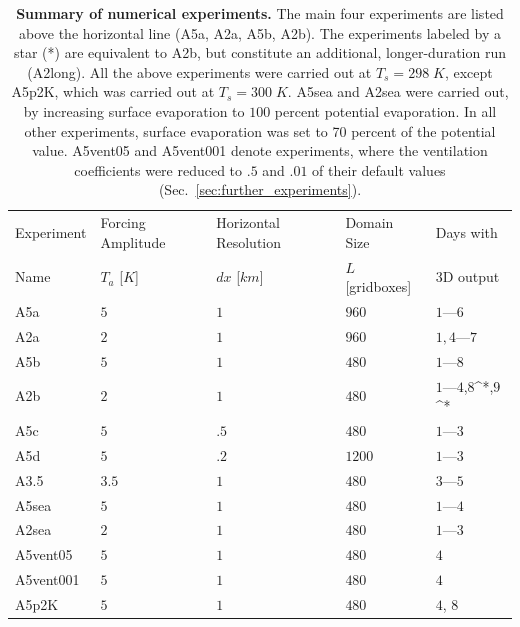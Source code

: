 \documentclass[draft,linenumbers]{agujournal2019}
\begin{document}
\begin{table}[b]
\begin{tabular}{lllll}
    Experiment & Forcing Amplitude & Horizontal Resolution & Domain Size & Days with\\
    Name & $T_a$ [$K$] & $dx$ [$km$] & $L$ [gridboxes] & 3D output\\
    \hline
    A5a & $5$ & $1$ & $960$ & $1$---$6$ \\
    A2a & $2$ & $1$ & $960$ & $1,4$---$7$ \\
    A5b & $5$ & $1$ & $480$ & $1$---$8$\\
    A2b & $2$ & $1$ & $480$ & $1$---$4$,$8$^*,$9$^*\\
    \hline
    A5c & $5$ & $.5$ & $480$ & $1$---$3$ \\
    A5d & $5$ & $.2$ & $1200$ & $1$---$3$ \\
    A3.5 & $3.5$ & $1$ & $480$ & $3$---$5$\\
    A5sea & $5$ & $1$ & $480$ & $1$---$4$\\
    A2sea & $2$ & $1$ & $480$ & $1$---$3$\\
    A5vent05 & $5$ & $1$ & $480$ & $4$\\
    A5vent001 & $5$ & $1$ & $480$ & $4$\\
    A5p2K & $5$ & $1$ & $480$ & $4$, $8$\\
    \hline
\end{tabular}
\caption{{\bf Summary of numerical experiments.}
The main four experiments are listed above the horizontal line (A5a, A2a, A5b, A2b). 
The experiments labeled by a star (*) are equivalent to A2b, but constitute an additional, longer-duration run (A2long).
All the above experiments were carried out at $T_s=298\;K$, except A5p2K, which was carried out at $T_s=300\;K$. 
A5sea and A2sea were carried out, by increasing surface evaporation to $100$ percent potential evaporation.
In all other experiments, surface evaporation was set to 70 percent of the potential value.
A5vent05 and A5vent001 denote experiments, where the ventilation coefficients \cite{seifert2006two} were reduced to $.5$ and $.01$ of their default values (Sec.~\ref{sec:further_experiments}). }
\label{tab:experiments}
\end{table}

\clearpage
\newpage
\pagebreak


%
%
%
%
\end{document}
